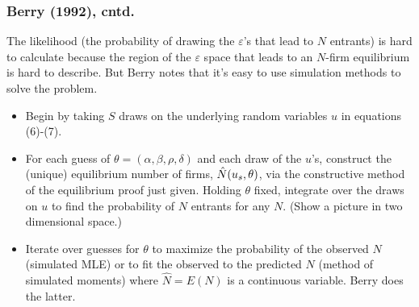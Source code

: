 \documentclass[notes=show]{beamer}
\begin{document}
\begin{frame}%

\frametitle{Berry (1992), cntd.}

The likelihood (the probability of drawing the $\varepsilon $'s that lead to 
$N$ entrants) is hard to calculate because the region of the $\varepsilon $
space that leads to an $N$-firm equilibrium is hard to describe. But Berry
notes that it's easy to use simulation methods to solve the problem.

\begin{itemize}
\item Begin by taking $S$ draws on the underlying random variables $u$ in
equations (6)-(7).

\item For each guess of $\theta =(\alpha ,\beta ,\rho ,\delta )$ and each
draw of the $u$'s, construct the (unique) equilibrium number of firms, $\hat{%
N}(u_{s},\theta )$, via the constructive method of the equilibrium proof
just given. Holding $\theta $ fixed, integrate over the draws on $u$ to find
the probability of $N$ entrants for any $N$. (Show a picture in two
dimensional space.)

\item Iterate over guesses for $\theta $ to maximize the probability of the
observed $N$ (simulated MLE) or to fit the observed to the predicted $N$
(method of simulated moments) where $\hat{N}=E(N)$ is a continuous variable.
Berry does the latter.
\end{itemize}

\end{frame}%
\end{document}
